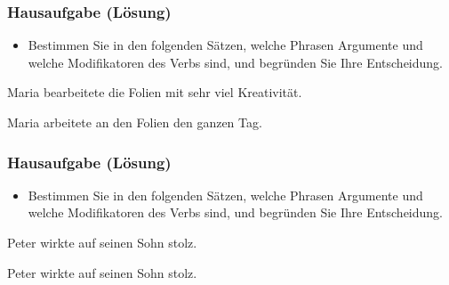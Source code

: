 \begin{frame}
\frametitle{Hausaufgabe (Lösung)} 

\begin{itemize}
	
	\item Bestimmen Sie in den folgenden Sätzen, welche Phrasen Argumente und welche Modifikatoren des Verbs sind, und begründen Sie Ihre Entscheidung.
	
\end{itemize}

\ea Maria bearbeitete die Folien mit sehr viel Kreativität.

\pause 
{}



\pause 


\ex Maria arbeitete an den Folien den ganzen Tag.

\pause 
{}



\z 

\end{frame}


\begin{frame}
\frametitle{Hausaufgabe (Lösung)} 

\begin{itemize}

\item Bestimmen Sie in den folgenden Sätzen, welche Phrasen Argumente und welche Modifikatoren des Verbs sind, und begründen Sie Ihre Entscheidung.

\end{itemize}

\ea Peter wirkte auf seinen Sohn stolz.

\pause 
{}



\pause 


\ex Peter wirkte auf seinen Sohn stolz.

\pause 
{}


\z 


\end{frame}